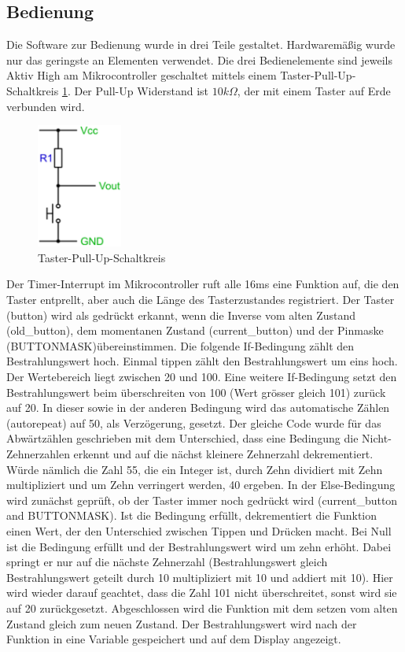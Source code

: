 \subsection{Bedienung}
Die Software zur Bedienung wurde in drei Teile gestaltet. Hardwaremäßig wurde nur das geringste an Elementen verwendet. Die drei Bedienelemente sind jeweils Aktiv High am Mikrocontroller geschaltet mittels einem Taster-Pull-Up-Schaltkreis \ref{fig:SwitchPullUp_Software}. Der Pull-Up Widerstand ist $10k\Omega$, der mit einem Taster auf Erde verbunden wird.

\begin{figure}[h]
	\centering
		\includegraphics[width=0.25\textwidth]{switchpullupcircuit.jpg}
	\caption{Taster-Pull-Up-Schaltkreis}
	\label{fig:SwitchPullUp_Software}
\end{figure}


Der Timer-Interrupt im Mikrocontroller ruft alle 16ms eine Funktion auf, die den Taster entprellt, aber auch die Länge des Tasterzustandes registriert.
Der Taster (button) wird als gedrückt erkannt, wenn die Inverse vom alten Zustand (old\_button), dem momentanen Zustand (current\_button) und der Pinmaske (BUTTONMASK)übereinstimmen.
Die folgende If-Bedingung zählt den Bestrahlungswert hoch. Einmal tippen zählt den Bestrahlungswert um eins hoch. Der Wertebereich liegt zwischen 20 und 100. Eine weitere If-Bedingung setzt den Bestrahlungswert beim überschreiten von 100 (Wert grösser gleich 101) zurück auf 20. In dieser sowie in der anderen Bedingung wird das automatische Zählen (autorepeat) auf 50, als Verzögerung, gesetzt.
Der gleiche Code wurde für das Abwärtzählen geschrieben mit dem Unterschied, dass eine Bedingung die Nicht-Zehnerzahlen erkennt und auf die nächst kleinere Zehnerzahl dekrementiert. Würde nämlich die Zahl 55, die ein Integer ist, durch Zehn dividiert mit Zehn multipliziert und um Zehn verringert werden, 40 ergeben.
In der Else-Bedingung wird zunächst geprüft, ob der Taster immer noch gedrückt wird (current\_button and BUTTONMASK). Ist die Bedingung erfüllt, dekrementiert die Funktion einen Wert, der den Unterschied zwischen Tippen und Drücken macht. Bei Null ist die Bedingung erfüllt und der Bestrahlungswert wird um zehn erhöht. Dabei springt er nur auf die nächste Zehnerzahl (Bestrahlungswert gleich Bestrahlungswert geteilt durch 10 multipliziert mit 10 und addiert mit 10). Hier wird wieder darauf geachtet, dass die Zahl 101 nicht überschreitet, sonst wird sie auf 20 zurückgesetzt.
Abgeschlossen wird die Funktion mit dem setzen vom alten Zustand gleich zum neuen Zustand.
Der Bestrahlungswert wird nach der Funktion in eine Variable gespeichert und auf dem Display angezeigt.
\newline